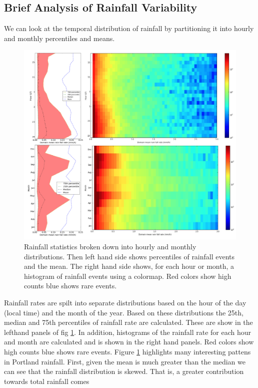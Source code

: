 \documentclass[twocol]{ametsoc}
\begin{document}
\subsection{Brief Analysis of Rainfall Variability}
We can look at the temporal distribution of rainfall by partitioning it into hourly and monthly percentiles and means. 
\begin{figure}
    \centering
    \includegraphics[width=1.0\columnwidth]{var.png}
    \caption{Rainfall statistics broken down into hourly and monthly distributions.  Then left hand side shows percentiles of 
    rainfall events and the mean.  The right hand side shows, for each hour or month, a histogram of rainfall events using a 
    colormap. Red colors show high counts blue shows rare events.}
    \label{fig:var}
\end{figure}
Rainfall rates are spilt into separate distributions based on the hour of the day (local time) and the month of the year. 
Based on these distributions the 25th, median and 75th percentiles of rainfall rate are calculated. These are show in 
the lefthand panels of fig \ref{fig:var}. In addition, histograms of the rainfall rate for each hour and month are calculated 
and is shown in the right hand panels. Red colors show high counts blue shows rare events. 
Figure \ref{fig:var} highlights many interesting pattens in Portland rainfall. First, given the mean is much greater than the 
median we can see that the rainfall distribution is skewed. That is, a greater contribution towards total rainfall comes 
\end{document}
